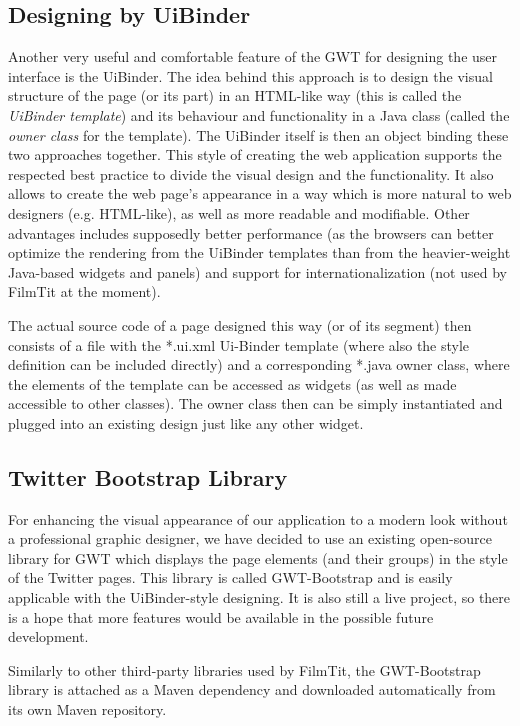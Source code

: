 \subsection{Designing by UiBinder}
Another very useful and comfortable feature of the GWT for designing the user interface is the UiBinder. The idea behind this approach is to design the visual structure of the page (or its part) in an HTML-like way (this is called the {\em UiBinder template}) and its behaviour and functionality in a Java class (called the {\em owner class} for the template). The UiBinder itself is then an object binding these two approaches together. This style of creating the web application supports the respected best practice to divide the visual design and the functionality. It also allows to create the web page's appearance in a way which is more natural to web designers (e.g. HTML-like), as well as more readable and modifiable. Other advantages includes supposedly better performance (as the browsers can better optimize the rendering from the UiBinder templates than from the heavier-weight Java-based widgets and panels) and support for internationalization (not used by FilmTit at the moment).

The actual source code of a page designed this way (or of its segment) then consists of a file with the *.ui.xml Ui-Binder template (where also the style definition can be included directly) and a corresponding *.java owner class, where the elements of the template can be accessed as widgets (as well as made accessible to other classes). The owner class then can be simply instantiated and plugged into an existing design just like any other widget.

\subsection{Twitter Bootstrap Library}
For enhancing the visual appearance of our application to a modern look without a professional graphic designer, we have decided to use an existing open-source library for GWT which displays the page elements (and their groups) in the style of the Twitter pages. This library is called GWT-Bootstrap and is easily applicable with the UiBinder-style designing. It is also still a live project, so there is a hope that more features would be available in the possible future development.

Similarly to other third-party libraries used by FilmTit, the GWT-Bootstrap library is attached as a Maven dependency and downloaded automatically from its own Maven repository.


